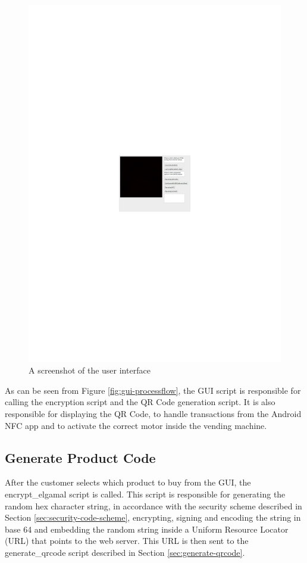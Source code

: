\begin{figure}[h]
 \centering 
 \includegraphics[scale=0.4]{gui_screenshot}
 \caption{A screenshot of the user interface}
 \label{fig:gui-screenshot}
\end{figure}

As can be seen from Figure \ref{fig:gui-processflow}, the GUI script is
responsible for calling the encryption script and the QR Code generation script.
It is also responsible for displaying the QR Code, to handle transactions from
the Android NFC app and to activate the correct motor inside the vending
machine. 

\subsection{Generate Product Code}

After the customer selects which product to buy from the GUI, the
encrypt\_elgamal script is called. This script is responsible for generating the
random hex character string, in accordance with the security scheme described in
Section \ref{sec:security-code-scheme}, encrypting, signing and encoding the
string in base 64 and embedding the random string inside a Uniform
Resource Locator (URL) that points to the web server. This URL is then sent to
the generate\_qrcode script described in Section \ref{sec:generate-qrcode}.


